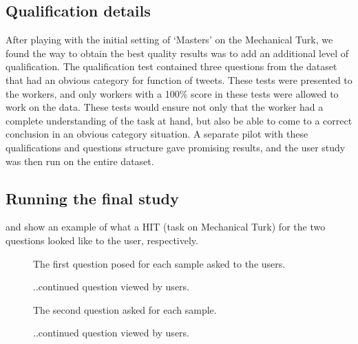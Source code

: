 \subsection{Qualification details}

After playing with the initial setting of `Masters' on the Mechanical Turk, we found the way to obtain the best quality results was to add an additional level of qualification. The qualification test contained three questions from the dataset that had an obvious category for function of tweets. These tests were presented to the workers, and only workers with a 100\% score in these tests were allowed to work on the data. These tests would ensure not only that the worker had a complete understanding of the task at hand, but also be able to come to a correct conclusion in an obvious category situation. A separate pilot with these qualifications and questions structure gave promising results, and the user study was then run on the entire dataset.

\subsection{Running the final study}

 and  show an example of what a HIT (task on Mechanical Turk) for the two questions looked like to the user, respectively.
\begin{figure}[!htbp]
  \centering 
  \subfloat{\texttt{[image: q11]}}
  \caption[User study question 1 example]{The first question posed for each sample asked to the users.}
  \label{fig:q1}
\end{figure}

\begin{figure}[!htbp]
  \ContinuedFloat 
  \centering 
  \subfloat{\texttt{[image: q12]}}%
  \caption[]{..continued question viewed by users.}
  \label{fig:q12}
\end{figure} 

\begin{figure}[!htbp]
  \centering 
  \subfloat{\texttt{[image: q21]}}
  \caption[User study question 2 example]{The second question asked for each sample.}
  \label{fig:q2}
\end{figure}

\begin{figure}[!htbp]
  \ContinuedFloat 
  \centering 
  \subfloat{\texttt{[image: q22]}}%
  \caption[]{..continued question viewed by users.}
  \label{fig:q22}
\end{figure} 

